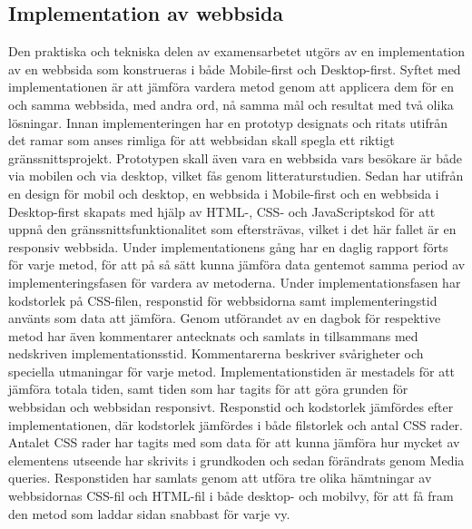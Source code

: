 \documentclass[11pt]{article}
\begin{document}
\subsection{Implementation av webbsida}
Den praktiska och tekniska delen av examensarbetet utgörs av en implementation av en webbsida som konstrueras i både Mobile-first och Desktop-first. Syftet med implementationen är att jämföra vardera metod genom att applicera dem för en och samma webbsida, med andra ord, nå samma mål och resultat med två olika lösningar. Innan implementeringen har en prototyp designats och ritats utifrån det ramar som anses rimliga för att webbsidan skall spegla ett riktigt gränssnittsprojekt. Prototypen skall även vara en webbsida vars besökare är både via mobilen och via desktop, vilket fås genom litteraturstudien. Sedan har utifrån en design för mobil och desktop, en webbsida i Mobile-first och en webbsida i Desktop-first skapats med hjälp av HTML-, CSS- och JavaScriptskod för att uppnå den gränssnittsfunktionalitet som eftersträvas, vilket i det här fallet är en responsiv webbsida. Under implementationens gång har en daglig rapport förts för varje metod, för att på så sätt kunna jämföra data gentemot samma period av implementeringsfasen för vardera av metoderna. Under implementationsfasen har kodstorlek på CSS-filen, responstid för webbsidorna samt implementeringstid använts som data att jämföra. Genom utförandet av en dagbok för respektive metod har även kommentarer antecknats och samlats in tillsammans med nedskriven implementationsstid. Kommentarerna beskriver svårigheter och speciella utmaningar för varje metod. Implementationstiden är mestadels för att jämföra totala tiden, samt tiden som har tagits för att göra grunden för webbsidan och webbsidan responsivt. Responstid och kodstorlek jämfördes efter implementationen, där kodstorlek jämfördes i både filstorlek och antal CSS rader. Antalet CSS rader har tagits med som data för att kunna jämföra hur mycket av elementens utseende har skrivits i grundkoden och sedan förändrats genom Media queries. Responstiden har samlats genom att utföra tre olika hämtningar av webbsidornas CSS-fil och HTML-fil i både desktop- och mobilvy, för att få fram den metod som laddar sidan snabbast för varje vy.
  
\end{document}

